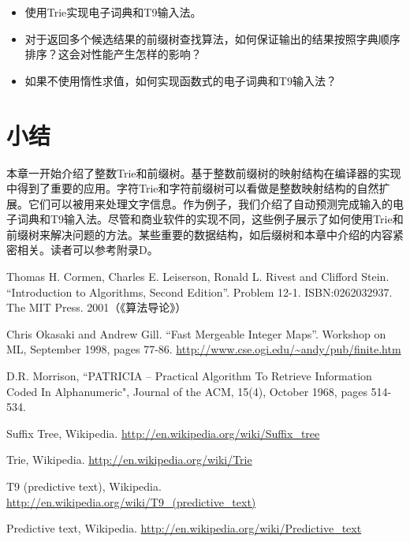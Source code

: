 \documentclass[b5paper]{ctexart}
\begin{document}
\begin{Exercise}
\begin{itemize}
\item 使用Trie实现电子词典和T9输入法。
\item 对于返回多个候选结果的前缀树查找算法，如何保证输出的结果按照字典顺序排序？这会对性能产生怎样的影响？
\item 如果不使用惰性求值，如何实现函数式的电子词典和T9输入法？
\end{itemize}
\end{Exercise}

\section{小结}

本章一开始介绍了整数Trie和前缀树。基于整数前缀树的映射结构在编译器的实现中得到了重要的应用。字符Trie和字符前缀树可以看做是整数映射结构的自然扩展。它们可以被用来处理文字信息。作为例子，我们介绍了自动预测完成输入的电子词典和T9输入法。尽管和商业软件的实现不同，这些例子展示了如何使用Trie和前缀树来解决问题的方法。某些重要的数据结构，如后缀树和本章中介绍的内容紧密相关。读者可以参考附录D。

\ifx\wholebook\relax\else
\begin{thebibliography}{99}

Thomas H. Cormen, Charles E. Leiserson, Ronald L. Rivest and Clifford Stein.
``Introduction to Algorithms, Second Edition''. Problem 12-1. ISBN:0262032937. The MIT Press. 2001（《算法导论》）

Chris Okasaki and Andrew Gill. ``Fast Mergeable Integer Maps''. Workshop on ML, September 1998, pages 77-86.  \url{http://www.cse.ogi.edu/~andy/pub/finite.htm}

D.R. Morrison, ``PATRICIA -- Practical Algorithm To Retrieve  Information Coded In Alphanumeric", Journal of the ACM, 15(4), October 1968, pages 514-534.

Suffix Tree, Wikipedia. \url{http://en.wikipedia.org/wiki/Suffix_tree}

Trie, Wikipedia. \url{http://en.wikipedia.org/wiki/Trie}

T9 (predictive text), Wikipedia. \url{http://en.wikipedia.org/wiki/T9_(predictive_text)}

Predictive text,
Wikipedia. \url{http://en.wikipedia.org/wiki/Predictive_text}

\end{thebibliography}
\end{document}
